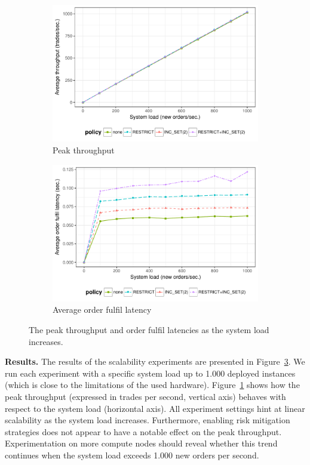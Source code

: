 \begin{figure}[t]
	\centering
	\begin{subfigure}{.9\textwidth}
		\centering
		\captionsetup{width=.9\linewidth}
		\includegraphics[width=.95\linewidth]{xchange/assets/experiments/scalability}
		\caption{Peak throughput}
		\label{fig:scalability}
	\end{subfigure}\vspace{0.3cm}
	\begin{subfigure}{.9\textwidth}
		\centering
		\captionsetup{width=.9\linewidth}
		\includegraphics[width=.95\linewidth]{xchange/assets/experiments/latency}
		\caption{Average order fulfil latency}
		\label{fig:latency}
	\end{subfigure}%
	\caption{The peak throughput and order fulfil latencies as the system load increases.}
	\label{fig:scalability_latency}
\end{figure}

\textbf{Results.}
The results of the scalability experiments are presented in Figure~\ref{fig:scalability_latency}.
We run each experiment with a specific system load up to 1.000 deployed instances (which is close to the limitations of the used hardware).
Figure~\ref{fig:scalability} shows how the peak throughput (expressed in trades per second, vertical axis) behaves with respect to the system load (horizontal axis).
All experiment settings hint at linear scalability as the system load increases.
Furthermore, enabling risk mitigation strategies does not appear to have a notable effect on the peak throughput.
Experimentation on more compute nodes should reveal whether this trend continues when the system load exceeds 1.000 new orders per second.


